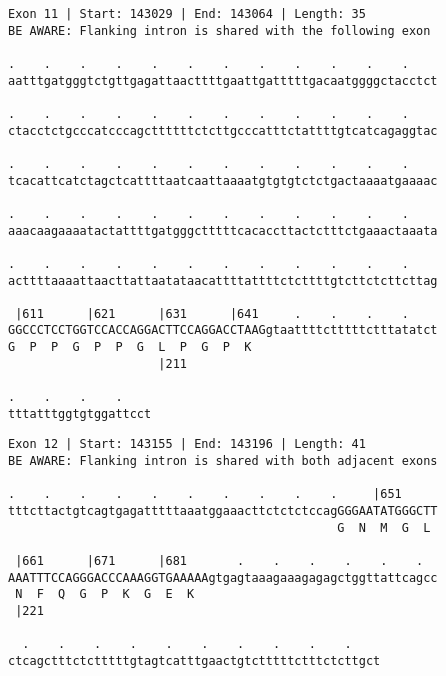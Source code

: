 \documentclass{article}
\begin{document}
\begin{Verbatim}[fontfamily=courier]
Exon 11 | Start: 143029 | End: 143064 | Length: 35
BE AWARE: Flanking intron is shared with the following exon

.    .    .    .    .    .    .    .    .    .    .    .    
aatttgatgggtctgttgagattaacttttgaattgatttttgacaatggggctacctct

.    .    .    .    .    .    .    .    .    .    .    .    
ctacctctgcccatcccagcttttttctcttgcccatttctattttgtcatcagaggtac

.    .    .    .    .    .    .    .    .    .    .    .    
tcacattcatctagctcattttaatcaattaaaatgtgtgtctctgactaaaatgaaaac

.    .    .    .    .    .    .    .    .    .    .    .    
aaacaagaaaatactattttgatgggctttttcacaccttactctttctgaaactaaata

.    .    .    .    .    .    .    .    .    .    .    .    
acttttaaaattaacttattaatataacattttattttctcttttgtcttctcttcttag

 |611      |621      |631      |641     .    .    .    .    
GGCCCTCCTGGTCCACCAGGACTTCCAGGACCTAAGgtaattttctttttctttatatct
G  P  P  G  P  P  G  L  P  G  P  K                          
                     |211                                   

.    .    .    .    
tttatttggtgtggattcct
\end{Verbatim}
\newpage
\begin{Verbatim}[fontfamily=courier]
Exon 12 | Start: 143155 | End: 143196 | Length: 41
BE AWARE: Flanking intron is shared with both adjacent exons

.    .    .    .    .    .    .    .    .    .     |651     
tttcttactgtcagtgagatttttaaatggaaacttctctctccagGGGAATATGGGCTT
                                              G  N  M  G  L 

 |661      |671      |681       .    .    .    .    .    .  
AAATTTCCAGGGACCCAAAGGTGAAAAAgtgagtaaagaaagagagctggttattcagcc
 N  F  Q  G  P  K  G  E  K                                  
 |221                                                       

  .    .    .    .    .    .    .    .    .    .    
ctcagctttctctttttgtagtcatttgaactgtctttttctttctcttgct
\end{Verbatim}
\newpage
\end{document}
